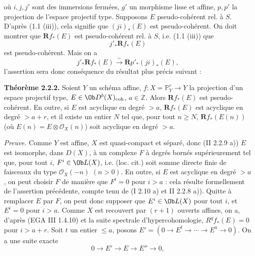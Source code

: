 où \(i,j,j'\)
sont des immersions fermées, \(g'\) un morphisme lisse et affine, \(p,p'\) la projection de l'espace projectif type. Supposons \(E\) pseudo-cohérent rel. à \(S\). D'après (1.1 (iii)), cela signifie que \((ji)_*(E)\) est pseudo-cohérent. On doit montrer que \(\mathbf Rf_*(E)\) est pseudo-cohérent rel. à \(S\), i.e. (1.1 (iii)) que
\[
  j'_*\mathbf Rf_*(E)
\]
est pseudo-cohérent. Mais on a
\[
  j'_*\mathbf Rf_*(E)\xrightarrow{\sim} \mathbf Rp'_*(ji)_*(E),
\]
l'assertion sera donc conséquence du résultat plus précis suivant :

\textbf{Théorème 2.2.2.} Soient \(Y\) un schéma affine, \(f:X=\mathbb P^r_Y\longrightarrow Y\) la projection d'un espace projectif type, \(E\in\Ob D^b(X)_{\mathrm{coh}}\), \(a\in\mathbb Z\). Alors \(\mathbf Rf_*(E)\) est pseudo-cohérent. En outre, si \(E\) est acyclique en degré \(>a\), \(\mathbf Rf_*(E)\) est acyclique en degré \(>a+r\), et il existe un entier \(N\) tel que, pour tout \(n\geq N\), \(\mathbf Rf_*(E(n))\) (où \(E(n)=E\otimes\mathcal O_X(n)\)) soit acyclique en degré \(>a\).

\emph{Preuve.} Comme \(Y\) est affine, \(X\) est quasi-compact et séparé, donc (II 2.2.9 a)) \(E\) est isomorphe, dans \(D(X)\), à un complexe \(F\) à degrés bornés supérieurement tel que, pour tout \(i\), \(F^i\in\Ob L(X)\), i.e. (loc. cit.) soit somme directe finie de faisceaux du type \(\mathcal O_X(-n)\) \((n>0)\). En outre, si \(E\) est acyclique en degré \(>a\), on peut choisir \(F\) de manière que \(F^i=0\) pour \(i>a\) : cela résulte formellement de l'assertion précédente, compte tenu de (I 2.10 a) et II 2.2.8 a)). Quitte à remplacer \(E\) par \(F\), on peut donc supposer que \(E^i\in\Ob L(X)\) pour tout \(i\), et \(E^i=0\) pour \(i>a\). Comme \(X\) est recouvert par \((r+1)\) ouverts affines, on a, d'après (EGA III 1.4.10) et la suite spectrale d'hypercohomologie, \(R^qf_*(E)=0\) pour \(i>a+r\). Soit \(t\) un entier \(\leq a\), posons \(E'=(0\to E^t\to\cdots\to E^a\to0)\). On a une suite exacte
\[
  0\longrightarrow E'\longrightarrow E\longrightarrow E''\longrightarrow0,
\]

